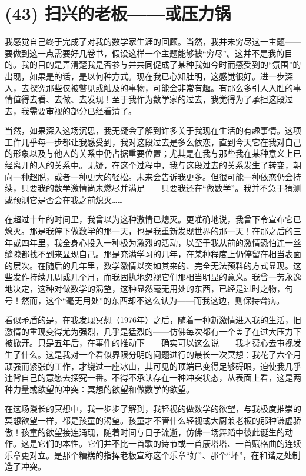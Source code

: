 \section{(43) 扫兴的老板——或压力锅}

我感觉自己终于完成了对我的数学家生涯的回顾。当然，我并未穷尽这一主题——要做到这一点需要好几卷书，假设这样一个主题能够被``穷尽''。这并不是我的目的。我的目的是弄清楚我是否参与并共同促成了某种我如今时而感受到的``氛围''的出现，如果是的话，是以何种方式。现在我已心知肚明，这感觉很好。进一步深入，去探究那些仅被瞥见或触及的事物，可能会非常有趣。有那么多引人入胜的事情值得去看、去做、去发现！至于我作为数学家的过去，我觉得为了承担这段过去，我需要审视的部分已经看清了。

当然，如果深入这场沉思，我无疑会了解到许多关于我现在生活的有趣事情。这项工作几乎每一步都让我感受到，我对这段过去是多么依恋，直到今天它在我对自己的形象以及与他人的关系中仍占据重要位置；尤其是在我与那些我在某种意义上已经离开的人的关系中。无疑，在这个过程中，我与这段过去的关系发生了转变，朝向一种超脱，或者一种更大的轻松。未来会告诉我更多。但很可能一种依恋仍会持续，只要我的数学激情尚未燃尽并满足——只要我还在``做数学''。我并不急于猜测或预测它是否会在我之前熄灭……

在超过十年的时间里，我曾以为这种激情已熄灭。更准确地说，我曾下令宣布它已熄灭。那是我停下做数学的那一天，也是我重新发现世界的那一天！在那之后的三年或四年里，我全身心投入一种极为激烈的活动，以至于我从前的激情恐怕连一丝缝隙都找不到来显现自己。那是充满学习的几年，在某种程度上仍停留在相当表面的层次。在随后的几年里，数学激情以突如其来的、完全无法预料的方式显现。这些发作持续几周或几个月，而我固执地忽视它们那相当明显的意义。我曾一劳永逸地决定，这种对做数学的渴望，这种显然毫无用处的东西，已经是过时之物，句号！然而，这个``毫无用处''的东西却不这么认为——而我这边，则保持聋病。

看似矛盾的是，在我发现冥想（1976年）之后，随着一种新激情进入我的生活，旧激情的重现变得尤为强烈，几乎是猛烈的——仿佛每次都有一个盖子在过大压力下被掀开。只是五年后，在事件的推动下——确实可以这么说——我才费心去审视发生了什么。这是我对一个看似界限分明的问题进行的最长一次冥想：我花了六个月顽强而紧张的工作，才绕过一座冰山，其可见的顶端已变得足够碍眼，迫使我几乎违背自己的意愿去探究一番。不得不承认存在一种冲突状态，从表面上看，这是两种力量或欲望的冲突：冥想的欲望和做数学的欲望。

在这场漫长的冥想中，我一步步了解到，我轻视的做数学的欲望，与我极度推崇的冥想欲望一样，都是孩童的渴望。孩童才不管什么轻视或大厨兼老板的那种谦虚骄傲！孩童的欲望接连涌现，随着时间与日子流逝，仿佛一场舞蹈中彼此诞生的动作。这是它们的本性。它们并不比一首歌的诗节或一首康塔塔、一首赋格曲的连续乐章更对立。是那个糟糕的指挥老板宣称这个乐章``好''、那个``坏''，在和谐之处制造了冲突。

